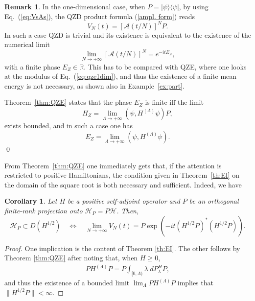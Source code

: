 \documentclass[aip,jmp
]{revtex4}
\newcommand{\RM}{\mathbb{R}}
\newtheorem{corollary}{Corollary}
\theoremstyle{definition}
\newtheorem{remark}{Remark}
\begin{document}
\begin{remark}
 In the one-dimensional case, when $P=|\psi\rangle\langle\psi|$, by using Eq.~(\ref{eq:VsAs}), the QZD product formula (\ref{ampl. form}) reads
\begin{equation*}
V_N(t)=[\mathcal{A}(t/N)]^N P.
\end{equation*}
In such a case QZD is trivial and its existence is equivalent to the existence of the numerical limit
\begin{equation}
\lim_{N\to+\infty} [\mathcal{A}(t/N)]^N = e^{-i t E_Z},
\label{eq:qze1dim}
\end{equation}
with a finite phase $E_Z \in \RM$. This has to be compared with  QZE, where one looks at the modulus of Eq.~(\ref{eq:qze1dim}), and thus the existence of a finite mean energy is not necessary, as shown also in Example~\ref{ex:part}.


Theorem~\ref {thm:QZE} states that the phase $E_Z$ is finite iff the limit
\begin{equation*}
H_Z = \lim_{\Lambda\to+\infty} (\psi,H^{(\Lambda)}\psi) P,
\end{equation*}
exists bounded, and in such a case one has
\begin{equation*}
E_Z = \lim_{\Lambda\to+\infty} (\psi,H^{(\Lambda)}\psi).
\end{equation*}
\qed
\end{remark}

From Theorem~\ref {thm:QZE} one immediately gets that, if the attention is restricted to  positive Hamiltonians, the condition given in Theorem~\ref{th:EI}  on the domain of the square root is both necessary and sufficient. Indeed, we have
\begin{corollary}\label{cor:QZE}
Let  $H$ be a
positive self-adjoint operator 
and $P$ be an orthogonal finite-rank projection onto $\mathcal{H}_{P}=P\mathcal{H}$.
Then,
\[
\mathcal{H}_{P} \subset D(H^{1/2})\quad \Leftrightarrow \quad  \lim_{N \to +\infty} V_{N}(t)= P\exp\left(-it(H^{1/2}P)^{*}(H^{1/2}P)\right) .
\]
\end{corollary}
\begin{proof}

One implication is the content of Theorem \ref{th:EI}. The other follows by Theorem \ref{thm:QZE} after noting that, when $H\geq 0$,
\begin{eqnarray*}
P H^{(\Lambda)} P= P \int_{[0,\Lambda)} \lambda\; dP_\lambda^H P,
\end{eqnarray*}
and thus the existence of a bounded limit  $\lim_{\Lambda} P H^{(\Lambda)} P$ implies that $\| H^{1/2}P\|<\infty$.
\end{proof}
\end{document}
